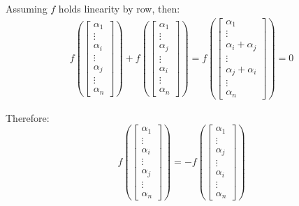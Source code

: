 \documentclass{article}
\begin{document}
Assuming \(f\) holds linearity by row, then:
\begin{equation}
\begin{split}
f(
\begin{bmatrix}
    \alpha_1 \\
    \vdots \\
    \alpha_i \\
    \vdots \\
    \alpha_j \\
    \vdots \\
    \alpha_n
\end{bmatrix}) + 
f(\begin{bmatrix}
    \alpha_1 \\
    \vdots \\
    \alpha_j \\
    \vdots \\
    \alpha_i \\
    \vdots \\
    \alpha_n
\end{bmatrix})
=
f(\begin{bmatrix}
    \alpha_1 \\
    \vdots \\
    \alpha_i + \alpha_j \\
    \vdots \\
    \alpha_j + \alpha_i \\
    \vdots \\
    \alpha_n
\end{bmatrix})=0
\end{split}
\end{equation}

Therefore:
\begin{equation}
f(
\begin{bmatrix}
    \alpha_1 \\
    \vdots \\
    \alpha_i \\
    \vdots \\
    \alpha_j \\
    \vdots \\
    \alpha_n
\end{bmatrix}) = 
-f(\begin{bmatrix}
    \alpha_1 \\
    \vdots \\
    \alpha_j \\
    \vdots \\
    \alpha_i \\
    \vdots \\
    \alpha_n
\end{bmatrix})
\end{equation}
\end{document}

